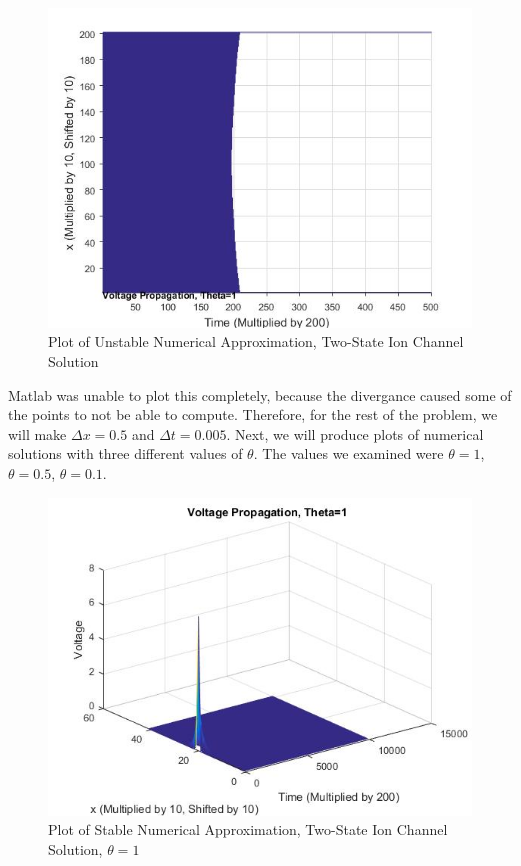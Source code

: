 \documentclass[12pt]{article}
\begin{document}
\begin{figure}[H]
  \includegraphics[width=\linewidth]{badplot3.jpg}
  \caption{Plot of Unstable Numerical Approximation, Two-State Ion Channel Solution}
  \label{fig:sketch3}
\end{figure}
Matlab was unable to plot this completely, because the divergance caused some of the points to not be able to compute. Therefore, for the rest of the problem, we will make $\Delta{x}=0.5$ and $\Delta{t}=0.005$. Next, we will produce plots of numerical solutions with three different values of $\theta$. The values we examined were $\theta=1$, $\theta=0.5$, $\theta=0.1$. 
\begin{figure}[H]
  \includegraphics[width=\linewidth]{thetaone.jpg}
  \caption{Plot of Stable Numerical Approximation, Two-State Ion Channel Solution, $\theta=1$}
  \label{fig:sketch4}
\end{figure}
\end{document}

